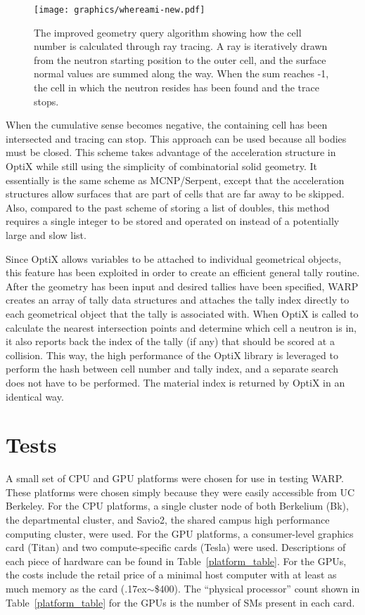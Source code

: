 \documentclass[preprint,12pt]{elsarticle}
\begin{document}
\begin{figure}[h!]
\centering
\texttt{[image: graphics/whereami-new.pdf]}
\caption{The improved geometry query algorithm showing how the cell number is calculated through ray tracing.  A ray is iteratively drawn from the neutron starting position to the outer cell, and the surface normal values are summed along the way.  When the sum reaches -1, the cell in which the neutron resides has been found and the trace stops. \label{whereami} }
\end{figure}

 When the cumulative sense becomes negative, the containing cell has been intersected and tracing can stop.  This approach can be used because all bodies must be closed.  This scheme takes advantage of the acceleration structure in OptiX while still using the simplicity of combinatorial solid geometry.  It essentially is the same scheme as MCNP/Serpent, except that the acceleration structures allow surfaces that are part of cells that are far away to be skipped.  Also, compared to the past scheme of storing a list of doubles, this method requires a single integer to be stored and operated on instead of a potentially large and slow list. 

Since OptiX allows variables to be attached to individual geometrical objects, this feature has been exploited in order to create an efficient general tally routine.  After the geometry has been input and desired tallies have been specified, WARP creates an array of tally data structures and attaches the tally index directly to each geometrical object that the tally is associated with.  When OptiX is called to calculate the nearest intersection points and determine which cell a neutron is in, it also reports back the index of the tally (if any) that should be scored at a collision.  This way, the high performance of the OptiX library is leveraged to perform the hash between cell number and tally index, and a separate search does not have to be performed.  The material index is returned by OptiX in an identical way.


\newpage
\section{Tests}
\label{sec:tests}

A small set of CPU and GPU platforms were chosen for use in testing WARP.  These platforms were chosen simply because they were easily accessible from UC Berkeley.  For the CPU platforms, a single cluster node of both Berkelium (Bk), the departmental cluster, and Savio2, the shared campus high performance computing cluster, were used.  For the GPU platforms, a consumer-level graphics card (Titan) and two compute-specific cards (Tesla) were used.  Descriptions of each piece of hardware can be found in Table~\ref{platform_table}. For the GPUs, the costs include the retail price of a minimal host computer with at least as much memory as the card ({\raise.17ex\hbox{$\scriptstyle\sim$}}\$400).  The ``physical processor'' count shown in Table~\ref{platform_table} for the GPUs is the number of SMs present in each card.  
\end{document}
